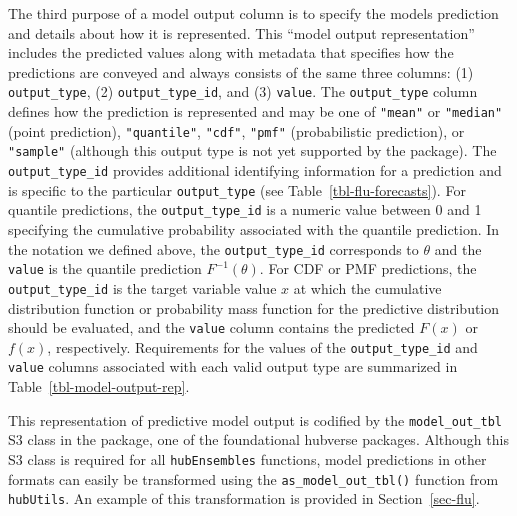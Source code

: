 \documentclass[
  article,
  shortnames,
  notitle]{jss}
\begin{document}
\begin{longtable}[]
\caption{\label{tbl-example-scenarios}Example of scenario projections
for cumulative COVID-19 deaths, formatted according to hubverse
standards. Quantile predictions for the median and 50\% prediction
intervals from a single model are shown for four distinct scenarios. The
\texttt{location} and \texttt{origin\_date} columns have been omitted
for brevity; all forecasts in this example were made on 2021-03-07 for
the US. This example is a subset of the
\texttt{example-complex-scenario-hub} data provided by the
hubverse\citep{hubverse_docs}.}

\tabularnewline
\end{longtable}

The third purpose of a model output column is to specify the models
prediction and details about how it is represented. This ``model output
representation'' includes the predicted values along with metadata that
specifies how the predictions are conveyed and always consists of the
same three columns: (1) \texttt{output\_type}, (2)
\texttt{output\_type\_id}, and (3) \texttt{value}. The
\texttt{output\_type} column defines how the prediction is represented
and may be one of \texttt{"mean"} or \texttt{"median"} (point
prediction), \texttt{"quantile"}, \texttt{"cdf"}, \texttt{"pmf"}
(probabilistic prediction), or \texttt{"sample"} (although this output
type is not yet supported by the  package). The
\texttt{output\_type\_id} provides additional identifying information
for a prediction and is specific to the particular \texttt{output\_type}
(see Table~\ref{tbl-flu-forecasts}). For quantile predictions, the
\texttt{output\_type\_id} is a numeric value between 0 and 1 specifying
the cumulative probability associated with the quantile prediction. In
the notation we defined above, the \texttt{output\_type\_id} corresponds
to \(\theta\) and the \texttt{value} is the quantile prediction
\(F^{-1}(\theta)\). For CDF or PMF predictions, the
\texttt{output\_type\_id} is the target variable value \(x\) at which
the cumulative distribution function or probability mass function for
the predictive distribution should be evaluated, and the \texttt{value}
column contains the predicted \(F(x)\) or \(f(x)\), respectively.
Requirements for the values of the \texttt{output\_type\_id} and
\texttt{value} columns associated with each valid output type are
summarized in Table~\ref{tbl-model-output-rep}.

This representation of predictive model output is codified by the
\texttt{model\_out\_tbl} S3 class in the  package, one of
the foundational hubverse packages. Although this S3 class is required
for all \texttt{hubEnsembles} functions, model predictions in other
formats can easily be transformed using the
\texttt{as\_model\_out\_tbl()} function from \texttt{hubUtils}. An
example of this transformation is provided in Section~\ref{sec-flu}.
\end{document}
